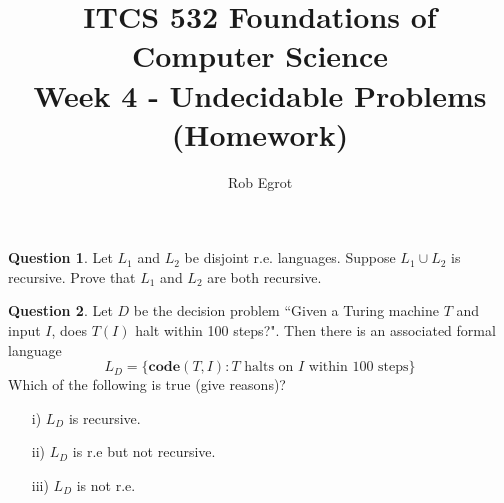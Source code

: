 \documentclass{article}
\title{ITCS 532 Foundations of Computer Science\\
Week 4 - Undecidable Problems (Homework)}
\author{Rob Egrot}
\date{}
\theoremstyle{definition}
\newtheorem{Q}{Question}
\newcommand{\co}{\mathbf{code}}
\begin{document}
\maketitle

\begin{Q}
Let $L_1$ and $L_2$ be disjoint r.e. languages. Suppose $L_1\cup L_2$ is recursive. Prove that $L_1$ and $L_2$ are both recursive.
\end{Q}
\begin{comment}
\textbf{Solution}\\
We will describe an algorithm for deciding $L_1$. 
\begin{enumerate}
\item Given a string $x$ we can decide if $x\in L_1\cup L_2$, as this language is recursive.
\item If $x\notin L_1\cup L_2$ then $x\notin L_1$, so reject.
\item If $x\in L_1\cup L_2$ then it must be in either $L_1\setminus L_2$, or $L_2\setminus L_1$. Use dovetailing to simultaneously run the algorithms that semidecide $L_1$ and $L_2$ on $x$.
\item If $x\in L_1$ then accept.
\item If $x\in L_2$ then reject.
\end{enumerate}
We can decide $L_2$ similarly.
\end{comment}

\begin{Q}\label{\prefix Q:100}
Let $D$ be the decision problem ``Given a Turing machine $T$ and input $I$, does $T(I)$ halt within 100 steps?". Then there is an associated formal language \[L_D=\{\co(T,I):T \text{ halts on } I \text{ within 100 steps}\}\]
Which of the following is true (give reasons)?
\begin{enumerate}
\item[i)] $L_D$ is recursive.
\item[ii)] $L_D$ is r.e but not recursive.
\item[iii)] $L_D$ is not r.e.
\end{enumerate}
\end{Q}
\begin{comment}
\textbf{Solution}\\
$L_D$ is recursive. To decide $L_D$ we use a Turing machine that, given input $\co(T,I)$ simulates $T(I)$, and also maintains a counter track of the number of steps that have been simulated. If this simulation halts before the counter reaches 100 then the input is accepted. If it does not (or if the input is not in the correct format), then it rejects.
\end{comment}
\end{document}
